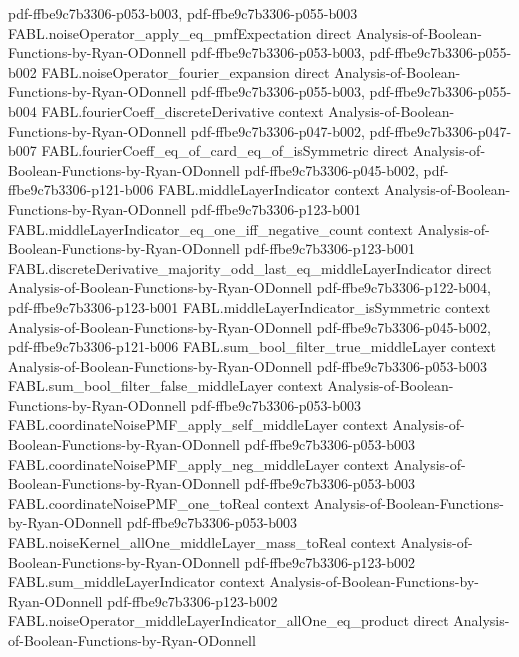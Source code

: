 \begin{theorem}
  {pdf-ffbe9c7b3306-p053-b003,
    pdf-ffbe9c7b3306-p055-b003}
\proofstep
  {FABL.noiseOperator_apply_eq_pmfExpectation}
  {direct}
  {Analysis-of-Boolean-Functions-by-Ryan-ODonnell}
  {pdf-ffbe9c7b3306-p053-b003,
    pdf-ffbe9c7b3306-p055-b002}
\proofstep
  {FABL.noiseOperator_fourier_expansion}
  {direct}
  {Analysis-of-Boolean-Functions-by-Ryan-ODonnell}
  {pdf-ffbe9c7b3306-p055-b003,
    pdf-ffbe9c7b3306-p055-b004}
\proofstep
  {FABL.fourierCoeff_discreteDerivative}
  {context}
  {Analysis-of-Boolean-Functions-by-Ryan-ODonnell}
  {pdf-ffbe9c7b3306-p047-b002,
    pdf-ffbe9c7b3306-p047-b007}
\proofstep
  {FABL.fourierCoeff_eq_of_card_eq_of_isSymmetric}
  {direct}
  {Analysis-of-Boolean-Functions-by-Ryan-ODonnell}
  {pdf-ffbe9c7b3306-p045-b002,
    pdf-ffbe9c7b3306-p121-b006}
\proofstep
  {FABL.middleLayerIndicator}
  {context}
  {Analysis-of-Boolean-Functions-by-Ryan-ODonnell}
  {pdf-ffbe9c7b3306-p123-b001}
\proofstep
  {FABL.middleLayerIndicator_eq_one_iff_negative_count}
  {context}
  {Analysis-of-Boolean-Functions-by-Ryan-ODonnell}
  {pdf-ffbe9c7b3306-p123-b001}
\proofstep
  {FABL.discreteDerivative_majority_odd_last_eq_middleLayerIndicator}
  {direct}
  {Analysis-of-Boolean-Functions-by-Ryan-ODonnell}
  {pdf-ffbe9c7b3306-p122-b004,
    pdf-ffbe9c7b3306-p123-b001}
\proofstep
  {FABL.middleLayerIndicator_isSymmetric}
  {context}
  {Analysis-of-Boolean-Functions-by-Ryan-ODonnell}
  {pdf-ffbe9c7b3306-p045-b002,
    pdf-ffbe9c7b3306-p121-b006}
\proofstep
  {FABL.sum_bool_filter_true_middleLayer}
  {context}
  {Analysis-of-Boolean-Functions-by-Ryan-ODonnell}
  {pdf-ffbe9c7b3306-p053-b003}
\proofstep
  {FABL.sum_bool_filter_false_middleLayer}
  {context}
  {Analysis-of-Boolean-Functions-by-Ryan-ODonnell}
  {pdf-ffbe9c7b3306-p053-b003}
\proofstep
  {FABL.coordinateNoisePMF_apply_self_middleLayer}
  {context}
  {Analysis-of-Boolean-Functions-by-Ryan-ODonnell}
  {pdf-ffbe9c7b3306-p053-b003}
\proofstep
  {FABL.coordinateNoisePMF_apply_neg_middleLayer}
  {context}
  {Analysis-of-Boolean-Functions-by-Ryan-ODonnell}
  {pdf-ffbe9c7b3306-p053-b003}
\proofstep
  {FABL.coordinateNoisePMF_one_toReal}
  {context}
  {Analysis-of-Boolean-Functions-by-Ryan-ODonnell}
  {pdf-ffbe9c7b3306-p053-b003}
\proofstep
  {FABL.noiseKernel_allOne_middleLayer_mass_toReal}
  {context}
  {Analysis-of-Boolean-Functions-by-Ryan-ODonnell}
  {pdf-ffbe9c7b3306-p123-b002}
\proofstep
  {FABL.sum_middleLayerIndicator}
  {context}
  {Analysis-of-Boolean-Functions-by-Ryan-ODonnell}
  {pdf-ffbe9c7b3306-p123-b002}
\proofstep
  {FABL.noiseOperator_middleLayerIndicator_allOne_eq_product}
  {direct}
  {Analysis-of-Boolean-Functions-by-Ryan-ODonnell}

\end{theorem}
